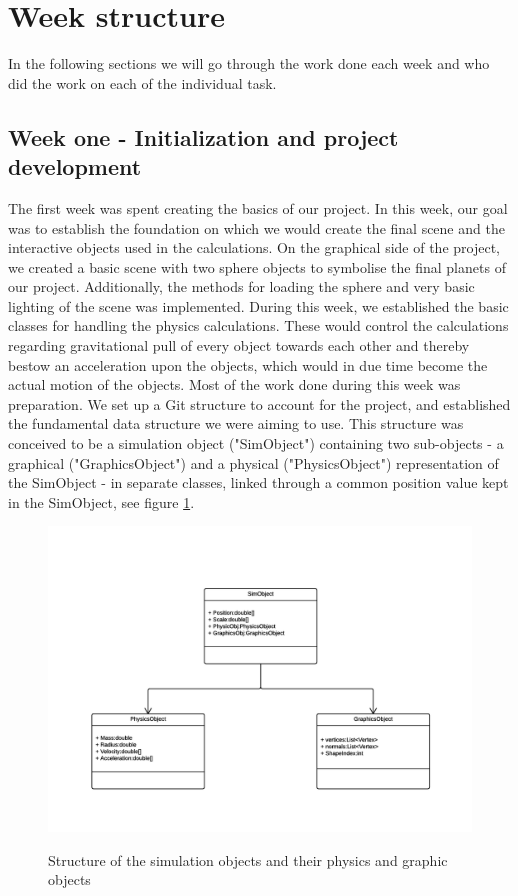\section{Week structure}
In the following sections we will go through the work done each week and who did the work on each of the individual task.
\subsection{Week one - Initialization and project development}
The first week was spent creating the basics of our project. In this week, our goal was to establish the foundation on which we would create the final scene and the interactive objects used in the calculations. 
On the graphical side of the project, we created a basic scene with two sphere objects to symbolise the final planets of our project. Additionally, the methods for loading the sphere and very basic lighting of the scene was implemented.
During this week, we established the basic classes for handling the physics calculations. These would control the calculations regarding gravitational pull of every object towards each other and thereby bestow an acceleration upon the objects, which would in due time become the actual motion of the objects.
Most of the work done during this week was preparation. We set up a Git structure to account for the project, and established the fundamental data structure we were aiming to use. This structure was conceived to be a simulation object ("SimObject") containing two sub-objects - a graphical ("GraphicsObject") and a physical ("PhysicsObject") representation of the SimObject - in separate classes, linked through a common position value kept in the SimObject, see figure \ref{GraphicsObjects}.
\begin{figure}[h]
\centering
\includegraphics[scale=0.7]{GraphicsProjectObjects.png}
\label{GraphicsObjects}
\caption{Structure of the simulation objects and their physics and graphic objects}
\end{figure}

